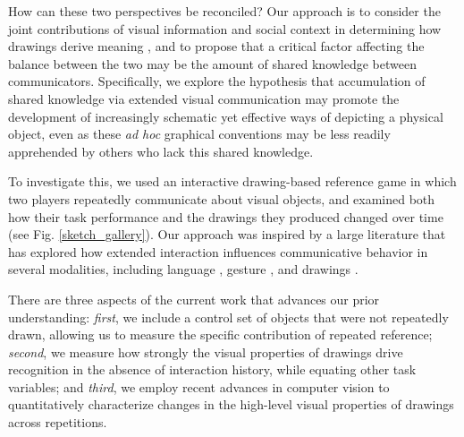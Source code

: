 \documentclass[10pt,letterpaper]{article}
\begin{document}
How can these two perspectives be reconciled?
Our approach is to consider the joint contributions of visual information and social context in determining how drawings derive meaning \cite{abell2009canny}, and to propose that a critical factor affecting the balance between the two may be the amount of shared knowledge between communicators.
Specifically, we explore the hypothesis that accumulation of shared knowledge via extended visual communication may promote the development of increasingly schematic yet effective ways of depicting a physical object, even as these \textit{ad hoc} graphical conventions may be less readily apprehended by others who lack this shared knowledge.

To investigate this, we used an interactive drawing-based reference game in which two players repeatedly communicate about visual objects, and examined both how their task performance and the drawings they produced changed over time (see Fig. \ref{sketch_gallery}).
Our approach was inspired by a large literature that has explored how extended interaction influences communicative behavior in several modalities, including language \cite{krauss1964changes,ClarkWilkesGibbs86_ReferringCollaborative,HawkinsFrankGoodman17_ConventionFormation}, gesture \cite{goldin1996silence,fay2014creating}, and drawings \cite{garrod_foundations_2007,fay2010interactive}.



There are three aspects of the current work that advances our prior understanding: \emph{first}, we include a control set of objects that were not repeatedly drawn, allowing us to measure the specific contribution of repeated reference; \emph{second}, we measure how strongly the visual properties of drawings drive recognition in the absence of interaction history, while equating other task variables; and \emph{third}, we employ recent advances in computer vision to quantitatively characterize changes in the high-level visual properties of drawings across repetitions.
\end{document}
